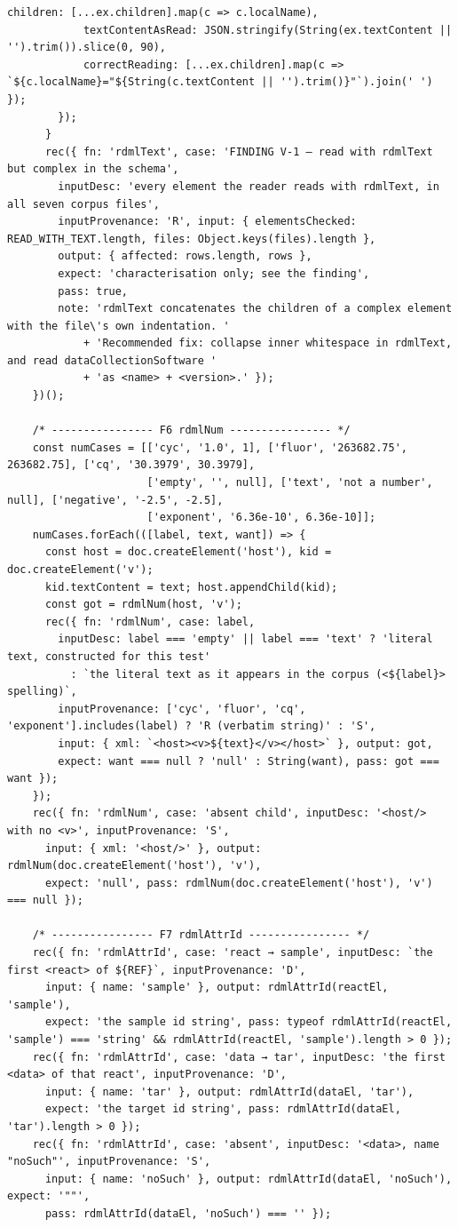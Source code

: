 \begin{lstlisting}[style=js]
            children: [...ex.children].map(c => c.localName),
            textContentAsRead: JSON.stringify(String(ex.textContent || '').trim()).slice(0, 90),
            correctReading: [...ex.children].map(c => `${c.localName}="${String(c.textContent || '').trim()}"`).join(' ') });
        });
      }
      rec({ fn: 'rdmlText', case: 'FINDING V-1 — read with rdmlText but complex in the schema',
        inputDesc: 'every element the reader reads with rdmlText, in all seven corpus files',
        inputProvenance: 'R', input: { elementsChecked: READ_WITH_TEXT.length, files: Object.keys(files).length },
        output: { affected: rows.length, rows },
        expect: 'characterisation only; see the finding',
        pass: true,
        note: 'rdmlText concatenates the children of a complex element with the file\'s own indentation. '
            + 'Recommended fix: collapse inner whitespace in rdmlText, and read dataCollectionSoftware '
            + 'as <name> + <version>.' });
    })();

    /* ---------------- F6 rdmlNum ---------------- */
    const numCases = [['cyc', '1.0', 1], ['fluor', '263682.75', 263682.75], ['cq', '30.3979', 30.3979],
                      ['empty', '', null], ['text', 'not a number', null], ['negative', '-2.5', -2.5],
                      ['exponent', '6.36e-10', 6.36e-10]];
    numCases.forEach(([label, text, want]) => {
      const host = doc.createElement('host'), kid = doc.createElement('v');
      kid.textContent = text; host.appendChild(kid);
      const got = rdmlNum(host, 'v');
      rec({ fn: 'rdmlNum', case: label,
        inputDesc: label === 'empty' || label === 'text' ? 'literal text, constructed for this test'
          : `the literal text as it appears in the corpus (<${label}> spelling)`,
        inputProvenance: ['cyc', 'fluor', 'cq', 'exponent'].includes(label) ? 'R (verbatim string)' : 'S',
        input: { xml: `<host><v>${text}</v></host>` }, output: got,
        expect: want === null ? 'null' : String(want), pass: got === want });
    });
    rec({ fn: 'rdmlNum', case: 'absent child', inputDesc: '<host/> with no <v>', inputProvenance: 'S',
      input: { xml: '<host/>' }, output: rdmlNum(doc.createElement('host'), 'v'),
      expect: 'null', pass: rdmlNum(doc.createElement('host'), 'v') === null });

    /* ---------------- F7 rdmlAttrId ---------------- */
    rec({ fn: 'rdmlAttrId', case: 'react → sample', inputDesc: `the first <react> of ${REF}`, inputProvenance: 'D',
      input: { name: 'sample' }, output: rdmlAttrId(reactEl, 'sample'),
      expect: 'the sample id string', pass: typeof rdmlAttrId(reactEl, 'sample') === 'string' && rdmlAttrId(reactEl, 'sample').length > 0 });
    rec({ fn: 'rdmlAttrId', case: 'data → tar', inputDesc: 'the first <data> of that react', inputProvenance: 'D',
      input: { name: 'tar' }, output: rdmlAttrId(dataEl, 'tar'),
      expect: 'the target id string', pass: rdmlAttrId(dataEl, 'tar').length > 0 });
    rec({ fn: 'rdmlAttrId', case: 'absent', inputDesc: '<data>, name "noSuch"', inputProvenance: 'S',
      input: { name: 'noSuch' }, output: rdmlAttrId(dataEl, 'noSuch'), expect: '""',
      pass: rdmlAttrId(dataEl, 'noSuch') === '' });


\end{lstlisting}
